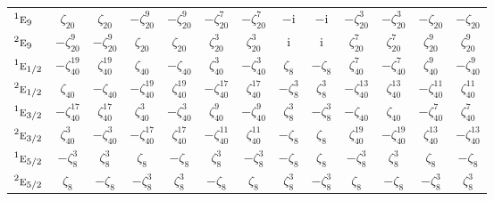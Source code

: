 \documentclass[10pt,a4paper]{article}
\makeatletter
\def\grouprule#1#2{\noalign{\marks\LTgroupmarks{\the\belowrulesep}\nobreak\vskip#1%
  \vskip\aboverulesep}\multispan\LT@cols\unskip{\leaders\hrule\@height#2\hfill\kern\z@}\cr
  \noalign{\penalty\LTrulebreak\vskip\belowrulesep\global\@lastruleclass\z@}}
\numberwithin{equation}{section}
\newcommand{\irr}[1]{\text{\normalfont\scshape #1}}
\newcommand{\conjpair}[1]{{}^{#1}}
\newcommand{\iunit}{\mathrm{i}}
\newcommand{\rootunity}[1]{\zeta_{#1}}
\makeatother
\begin{document}
{\begin{longtable}{@{}lcccccccccccc@{}}
$\conjpair{1}\irr{e}_{9}$ & $\rootunity{20}$ & $\rootunity{20}$ & $-\rootunity{20}^{9}$ & $-\rootunity{20}^{9}$ & $-\rootunity{20}^{7}$ & $-\rootunity{20}^{7}$ & $-\iunit{}$ & $-\iunit{}$ & $-\rootunity{20}^{3}$ & $-\rootunity{20}^{3}$ & $-\rootunity{20}$ & $-\rootunity{20}$\\
$\conjpair{2}\irr{e}_{9}$ & $-\rootunity{20}^{9}$ & $-\rootunity{20}^{9}$ & $\rootunity{20}$ & $\rootunity{20}$ & $\rootunity{20}^{3}$ & $\rootunity{20}^{3}$ & $\iunit{}$ & $\iunit{}$ & $\rootunity{20}^{7}$ & $\rootunity{20}^{7}$ & $\rootunity{20}^{9}$ & $\rootunity{20}^{9}$\\
\grouprule{0pt}{\lightrulewidth}
$\conjpair{1}\irr{e}_{1/2}$ & $-\rootunity{40}^{19}$ & $\rootunity{40}^{19}$ & $\rootunity{40}$ & $-\rootunity{40}$ & $\rootunity{40}^{3}$ & $-\rootunity{40}^{3}$ & $\rootunity{8}$ & $-\rootunity{8}$ & $\rootunity{40}^{7}$ & $-\rootunity{40}^{7}$ & $\rootunity{40}^{9}$ & $-\rootunity{40}^{9}$\\
$\conjpair{2}\irr{e}_{1/2}$ & $\rootunity{40}$ & $-\rootunity{40}$ & $-\rootunity{40}^{19}$ & $\rootunity{40}^{19}$ & $-\rootunity{40}^{17}$ & $\rootunity{40}^{17}$ & $-\rootunity{8}^{3}$ & $\rootunity{8}^{3}$ & $-\rootunity{40}^{13}$ & $\rootunity{40}^{13}$ & $-\rootunity{40}^{11}$ & $\rootunity{40}^{11}$\\
$\conjpair{1}\irr{e}_{3/2}$ & $-\rootunity{40}^{17}$ & $\rootunity{40}^{17}$ & $\rootunity{40}^{3}$ & $-\rootunity{40}^{3}$ & $\rootunity{40}^{9}$ & $-\rootunity{40}^{9}$ & $\rootunity{8}^{3}$ & $-\rootunity{8}^{3}$ & $-\rootunity{40}$ & $\rootunity{40}$ & $-\rootunity{40}^{7}$ & $\rootunity{40}^{7}$\\
$\conjpair{2}\irr{e}_{3/2}$ & $\rootunity{40}^{3}$ & $-\rootunity{40}^{3}$ & $-\rootunity{40}^{17}$ & $\rootunity{40}^{17}$ & $-\rootunity{40}^{11}$ & $\rootunity{40}^{11}$ & $-\rootunity{8}$ & $\rootunity{8}$ & $\rootunity{40}^{19}$ & $-\rootunity{40}^{19}$ & $\rootunity{40}^{13}$ & $-\rootunity{40}^{13}$\\
$\conjpair{1}\irr{e}_{5/2}$ & $-\rootunity{8}^{3}$ & $\rootunity{8}^{3}$ & $\rootunity{8}$ & $-\rootunity{8}$ & $\rootunity{8}^{3}$ & $-\rootunity{8}^{3}$ & $-\rootunity{8}$ & $\rootunity{8}$ & $-\rootunity{8}^{3}$ & $\rootunity{8}^{3}$ & $\rootunity{8}$ & $-\rootunity{8}$\\
$\conjpair{2}\irr{e}_{5/2}$ & $\rootunity{8}$ & $-\rootunity{8}$ & $-\rootunity{8}^{3}$ & $\rootunity{8}^{3}$ & $-\rootunity{8}$ & $\rootunity{8}$ & $\rootunity{8}^{3}$ & $-\rootunity{8}^{3}$ & $\rootunity{8}$ & $-\rootunity{8}$ & $-\rootunity{8}^{3}$ & $\rootunity{8}^{3}$\\

\end{longtable}}
\end{document}
